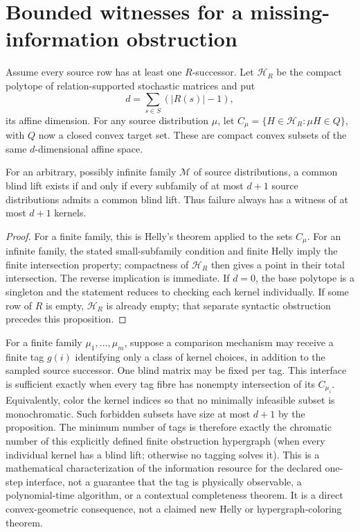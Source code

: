 \documentclass[11pt]{article}
\begin{document}
\section{Bounded witnesses for a missing-information obstruction}
Assume every source row has at least one $R$-successor. Let $\mathcal H_R$ be the compact polytope of relation-supported stochastic matrices and put
\[
 d=\sum_{s\in S}(|R(s)|-1),
\]
its affine dimension. For any source distribution $\mu$, let $C_\mu=\{H\in\mathcal H_R:\mu H\in Q\}$, with $Q$ now a closed convex target set. These are compact convex subsets of the same $d$-dimensional affine space.

\begin{proposition}
For an arbitrary, possibly infinite family $\mathcal M$ of source distributions, a common blind lift exists if and only if every subfamily of at most $d+1$ source distributions admits a common blind lift. Thus failure always has a witness of at most $d+1$ kernels.
\end{proposition}
\begin{proof}
For a finite family, this is Helly's theorem applied to the sets $C_\mu$. For an infinite family, the stated small-subfamily condition and finite Helly imply the finite intersection property; compactness of $\mathcal H_R$ then gives a point in their total intersection. The reverse implication is immediate. If $d=0$, the base polytope is a singleton and the statement reduces to checking each kernel individually. If some row of $R$ is empty, $\mathcal H_R$ is already empty; that separate syntactic obstruction precedes this proposition.
\end{proof}

For a finite family $\mu_1,\ldots,\mu_m$, suppose a comparison mechanism may receive a finite tag $g(i)$ identifying only a class of kernel choices, in addition to the sampled source successor. One blind matrix may be fixed per tag. This interface is sufficient exactly when every tag fibre has nonempty intersection of its $C_{\mu_i}$. Equivalently, color the kernel indices so that no minimally infeasible subset is monochromatic. Such forbidden subsets have size at most $d+1$ by the proposition. The minimum number of tags is therefore exactly the chromatic number of this explicitly defined finite obstruction hypergraph (when every individual kernel has a blind lift; otherwise no tagging solves it). This is a mathematical characterization of the information resource for the declared one-step interface, not a guarantee that the tag is physically observable, a polynomial-time algorithm, or a contextual completeness theorem. It is a direct convex-geometric consequence, not a claimed new Helly or hypergraph-coloring theorem.
\end{document}
